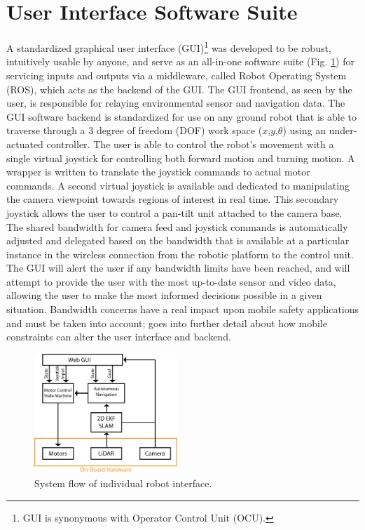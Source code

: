 \section{User Interface Software Suite}\label{sec:ui}

A standardized graphical user interface (GUI)\footnote{GUI is synonymous with Operator Control Unit (OCU).} was developed to be robust, intuitively usable by anyone, and serve as an all-in-one software suite (Fig. \ref{fig:gui_flow}) for servicing inputs and outputs via a middleware, called Robot Operating System (ROS), which acts as the backend of the GUI. The GUI frontend, as seen by the user, is responsible for relaying environmental sensor and navigation data. The GUI software backend is standardized for use on any ground robot that is able to traverse through a 3 degree of freedom (DOF) work space ($x$,$y$,$\theta$) using an under-actuated controller. The user is able to control the robot's movement with a single virtual joystick for controlling both forward motion and turning motion. A wrapper is written to translate the joystick commands to actual motor commands. A second virtual joystick is available and dedicated to manipulating the camera viewpoint towards regions of interest in real time. This secondary joystick allows the user to control a pan-tilt unit attached to the camera base. The shared bandwidth for camera feed and joystick commands is automatically adjusted and delegated based on the bandwidth that is available at a particular instance in the wireless connection from the robotic platform to the control unit. The GUI will alert the user if any bandwidth limits have been reached, and will attempt to provide the user with the most up-to-date sensor and video data, allowing the user to make the most informed decisions possible in a given situation. Bandwidth concerns have a real impact upon mobile safety applications and must be taken into account; \cite{erikson2013} goes into further detail about how mobile constraints can alter the user interface and backend.

\begin{figure}
	\centering
	\includegraphics[width=0.48\textwidth]{pictures/Korpela_GUI.png}
	\caption{System flow of individual robot interface.}
	\label{fig:gui_flow}
\end{figure}

